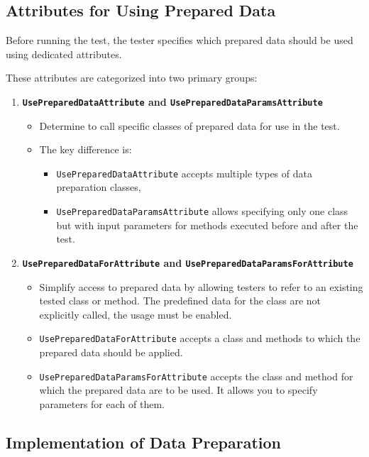 \subsection{Attributes for Using Prepared Data}

Before running the test, the tester specifies which prepared data should be used using dedicated attributes.

These attributes are categorized into two primary groups:

\begin{enumerate}
    \item \textbf{\texttt{UsePreparedDataAttribute} and \texttt{UsePreparedDataParamsAttribute}}
    \begin{itemize}
        \item Determine to call specific classes of prepared data for use in the test.
        \item The key difference is:
        \begin{itemize}
            \item \texttt{UsePreparedDataAttribute} accepts multiple types of data preparation classes,
            \item \texttt{UsePreparedDataParamsAttribute} allows specifying only one class but with input parameters for methods executed before and after the test.
        \end{itemize}
    \end{itemize}

    \item \textbf{\texttt{UsePreparedDataForAttribute} and \texttt{UsePreparedDataParamsForAttribute}}
    \begin{itemize}
        \item  Simplify access to prepared data by allowing testers to refer to an existing tested class or method. The predefined data for the class are not explicitly called, the usage must be enabled.
        \item \texttt{UsePreparedDataForAttribute} accepts a class and methods to which the prepared data should be applied.
        \item \texttt{UsePreparedDataParamsForAttribute} accepts the class and method for which the prepared data are to be used. It allows you to specify parameters for each of them.
    \end{itemize}
\end{enumerate}

\subsection{Implementation of Data Preparation}


